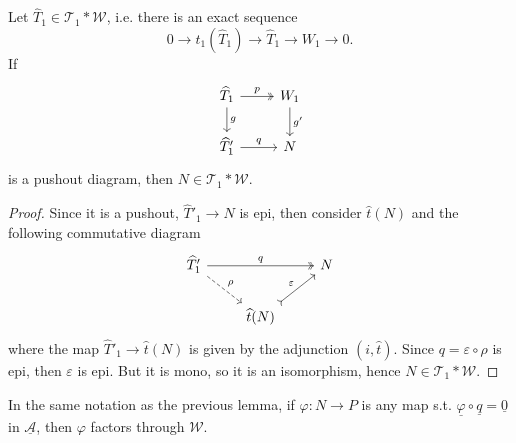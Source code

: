 \begin{lemma}\label{ab:lem:5}
  Let $\widehat{T}_1\in\mathcal{T}_1\ast\mathcal{W}$, i.e. there is an exact sequence
  \begin{equation*}
    0\to t_1(\widehat{T}_1)\to \widehat{T}_1\to W_1\to 0.
  \end{equation*}
  If
  \begin{equation*}
    \begin{tikzcd}
      \widehat{T}_1\arrow[two heads]{r}{p}\arrow{d}{g}
        & W_1\arrow{d}{g'} \\
      \widehat{T}'_1\arrow{r}{q}&N
    \end{tikzcd}
  \end{equation*}
  is a pushout diagram, then $N\in\mathcal{T}_1\ast\mathcal{W}$.
\end{lemma}

\begin{proof}
  Since it is a pushout, $\widehat{T}'_1 \to N$ is epi, then consider $\widehat{t}(N)$
  and the following commutative diagram
  \begin{equation*}
    \begin{tikzcd}
      \widehat{T}'_1\arrow[two heads]{rr}{q} \arrow[dashed]{dr}{\rho}
        & & N\\
        & \widehat{t}(N)\arrow[tail]{ur}{\varepsilon}
          &
    \end{tikzcd}
  \end{equation*}
  where the map $\widehat{T}'_1\to \widehat{t}(N)$ is given by the adjunction $(i,\widehat{t})$.
  Since $q=\varepsilon\circ\rho$ is epi, then $\varepsilon$ is epi. But it is mono, so it is an isomorphism,
  hence $N\in\mathcal{T}_1\ast\mathcal{W}$.
\end{proof}

\begin{lemma}\label{ab:lem:6}
  In the same notation as the previous lemma, if $\varphi:N\to P$ is any map s.t. $\underline{\varphi}\circ \underline{q} = \underline{0}$ in
  $\underline{\mathcal{A}}$, then $\varphi$ factors through $\mathcal{W}$.
\end{lemma}

